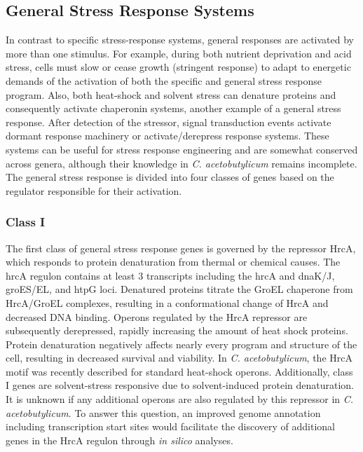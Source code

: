 \subsection{General Stress Response Systems}

In contrast to specific stress-response systems, general responses are activated by more than one stimulus. For example, during both nutrient deprivation and acid stress, cells must slow or cease growth (stringent response) to adapt to energetic demands of the activation of both the specific and general stress response program. Also, both heat-shock and solvent stress can denature proteins and consequently activate chaperonin systems, another example of a general stress response.\cite{74,75,77} After detection of the stressor, signal transduction events activate dormant response machinery or activate/derepress response systems\cite{77,78}. These systems can be useful for stress response engineering\cite{45,46} and are somewhat conserved across genera, although their knowledge in \textit{C. acetobutylicum} remains incomplete. The general stress response is divided into four classes of genes based on the regulator responsible for their activation. 

\subsubsection{Class I}
The first class of general stress response genes is governed by the repressor HrcA, which responds to protein denaturation from thermal or chemical causes. The hrcA regulon contains at least 3 transcripts including the hrcA and dnaK/J, groES/EL, and htpG loci.\cite{42} Denatured proteins titrate the GroEL chaperone from HrcA/GroEL complexes, resulting in a conformational change of HrcA and decreased DNA binding.\cite{77,78} Operons regulated by the HrcA repressor are subsequently derepressed, rapidly increasing the amount of heat shock proteins. Protein denaturation negatively affects nearly every program and structure of the cell, resulting in decreased survival and viability. In \textit{C. acetobutylicum}, the HrcA motif was recently described for standard heat-shock operons.\cite{42} Additionally, class I genes are solvent-stress responsive due to solvent-induced protein denaturation.\cite{74,75} It is unknown if any additional operons are also regulated by this repressor in \textit{C. acetobutylicum}. To answer this question, an improved genome annotation including transcription start sites would facilitate the discovery of additional genes in the HrcA regulon through \textit{in silico} analyses.

